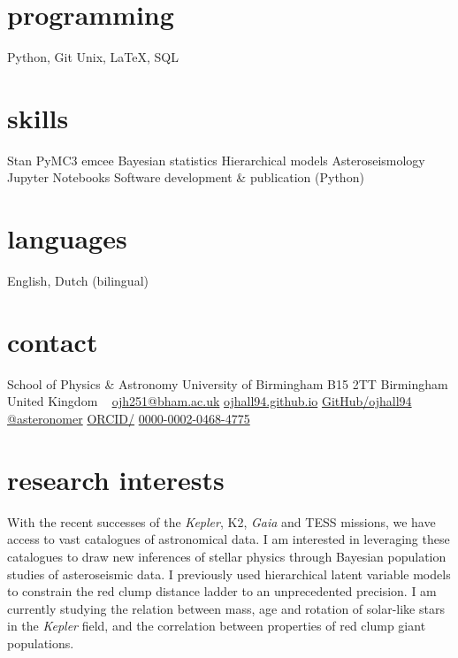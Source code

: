 \documentclass[]{k-cv} %
\begin{document}


\begin{aside} %
\section{\color{c1}programming}
\bodyfont Python, Git
Unix, LaTeX,
SQL
\section{\color{c2}skills}
Stan
PyMC3
emcee 
Bayesian statistics
Hierarchical models
Asteroseismology
Jupyter Notebooks
Software development \& publication (Python)
\section{\color{c3}languages}
English, Dutch (bilingual)
\section{\color{c4}contact}
School of Physics \& Astronomy
University of Birmingham
B15 2TT
Birmingham
United Kingdom
~
\href{mailto:ojh251@student.bham.ac.uk}{ojh251@bham.ac.uk}
\href{http://www.ojhall94.github.io}{ojhall94.github.io}
\href{http://www.github.com/ojhall94}{GitHub/ojhall94}
\href{http://www.twitter.com/asteronomer}{@asteronomer}
\href{http://www.orcid.com/0000-0002-0468-4775}{ORCID/}
\href{http://www.orcid.com/0000-0002-0468-4775}{0000-0002-0468-4775}
\end{aside}

\section{\color{c1}research interests}
\parbox{14.0cm}{\bodyfont With the recent successes of the \textit{Kepler}, K2, \textit{Gaia} and TESS missions, we have access to vast catalogues of astronomical data. I am interested in leveraging these catalogues to draw new inferences of stellar physics through Bayesian population studies of asteroseismic data. I previously used hierarchical latent variable models to constrain the red clump distance ladder to an unprecedented precision. I am currently studying the relation between mass, age and rotation of solar-like stars in the \textit{Kepler} field, and the correlation between properties of red clump giant populations.}
\vspace{.1\parskip}
\end{document}
